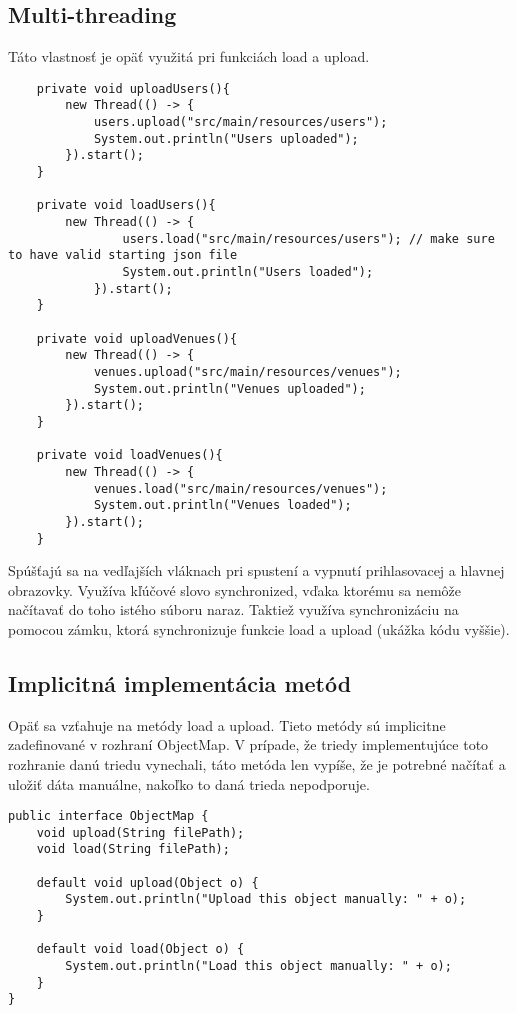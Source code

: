 \documentclass{article}
\begin{document}
\subsection{Multi-threading}
Táto vlastnosť je opäť využitá pri funkciách load a upload.

\begin{verbatim}
    private void uploadUsers(){
        new Thread(() -> {
            users.upload("src/main/resources/users");
            System.out.println("Users uploaded");
        }).start();
    }

    private void loadUsers(){
        new Thread(() -> {
                users.load("src/main/resources/users"); // make sure to have valid starting json file
                System.out.println("Users loaded");
            }).start();
    }

    private void uploadVenues(){
        new Thread(() -> {
            venues.upload("src/main/resources/venues");
            System.out.println("Venues uploaded");
        }).start();
    }

    private void loadVenues(){
        new Thread(() -> {
            venues.load("src/main/resources/venues");
            System.out.println("Venues loaded");
        }).start();
    }
\end{verbatim}
Spúšťajú sa na vedľajších vláknach pri spustení a vypnutí prihlasovacej a hlavnej obrazovky. Využíva kľúčové slovo synchronized, vďaka ktorému sa nemôže načítavať do toho istého súboru naraz. Taktiež využíva synchronizáciu na pomocou zámku, ktorá synchronizuje funkcie load a upload (ukážka kódu vyššie). 

\subsection{Implicitná implementácia metód}
Opäť sa vzťahuje na metódy load a upload. Tieto metódy sú implicitne zadefinované v rozhraní ObjectMap. V prípade, že triedy implementujúce toto rozhranie danú triedu vynechali, táto metóda len vypíše, že je potrebné načítať a uložiť dáta manuálne, nakoľko to daná trieda nepodporuje.
\begin{verbatim}
public interface ObjectMap {
    void upload(String filePath);
    void load(String filePath);

    default void upload(Object o) {
        System.out.println("Upload this object manually: " + o);
    }

    default void load(Object o) {
        System.out.println("Load this object manually: " + o);
    }
}

\end{verbatim}
\end{document}
